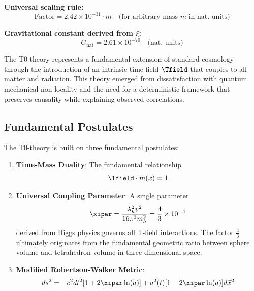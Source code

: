 	\textbf{Universal scaling rule:}
	\begin{equation}
		\text{Factor} = 2.42 \times 10^{-31} \cdot m \quad \text{(for arbitrary mass } m \text{ in nat. units)}
	\end{equation}
	
	\textbf{Gravitational constant derived from $\xi$:}
	\begin{equation}
		G_{\text{nat}} = 2.61 \times 10^{-70} \quad \text{(nat. units)}
	\end{equation}
	\label{sec:t0_framework}
	
	The T0-theory represents a fundamental extension of standard cosmology through the introduction of an intrinsic time field $\Tfield$ that couples to all matter and radiation. This theory emerged from dissatisfaction with quantum mechanical non-locality and the need for a deterministic framework that preserves causality while explaining observed correlations.
	
	\subsection{Fundamental Postulates}
	
	The T0-theory is built on three fundamental postulates:
	
	\begin{enumerate}
		\item \textbf{Time-Mass Duality}: The fundamental relationship
		\begin{equation}
			\Tfield \cdot m(x) = 1
			\label{eq:time_mass_duality}
		\end{equation}
		
		\item \textbf{Universal Coupling Parameter}: A single parameter
		\begin{equation}
			\xipar = \frac{\lambda_h^2 v^2}{16\pi^3 m_h^2} = \frac{4}{3} \times 10^{-4}
			\label{eq:xi_definition}
		\end{equation}
		derived from Higgs physics governs all T-field interactions. The factor $\frac{4}{3}$ ultimately originates from the fundamental geometric ratio between sphere volume and tetrahedron volume in three-dimensional space.
		
		\item \textbf{Modified Robertson-Walker Metric}:
		\begin{equation}
			ds^2 = -c^2dt^2[1 + 2\xipar\ln(a)] + a^2(t)[1 - 2\xipar\ln(a)]d\vec{x}^2
			\label{eq:modified_metric}
		\end{equation}
	\end{enumerate}
	
